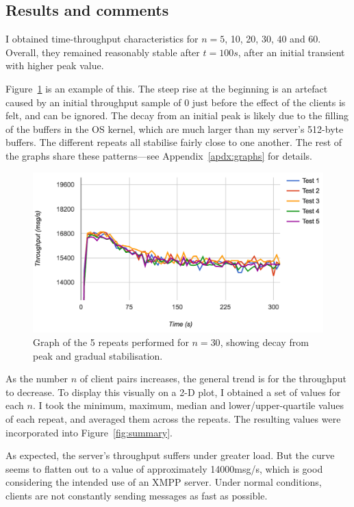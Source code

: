 \subsection{Results and comments}
I obtained time-throughput characteristics for $n=5$, 10, 20, 30, 40 and 60. Overall, they remained reasonably stable after $t=100s$, after an initial transient with higher peak value.

Figure~\ref{fig:example-chstic} is an example of this. The steep rise at the beginning is an artefact caused by an initial throughput sample of $0$ just before the effect of the clients is felt, and can be ignored. The decay from an initial peak is likely due to the filling of the buffers in the OS kernel, which are much larger than my server's 512-byte buffers. The different repeats all stabilise fairly close to one another. The rest of the graphs share these patterns---see Appendix~\ref{apdx:graphs} for details.

\begin{figure}
  \centering\includegraphics[width=\textwidth]{../transcripts/lipsum/30n30/cold/cold.png}
  \caption{Graph of the 5 repeats performed for $n=30$, showing decay from peak and gradual stabilisation.}
  \label{fig:example-chstic}
\end{figure}

As the number $n$ of client pairs increases, the general trend is for the throughput to decrease. To display this visually on a 2-D plot, I obtained a set of values for each $n$. I took the minimum, maximum, median and lower/upper-quartile values of each repeat, and averaged them across the repeats. The resulting values were incorporated into Figure~\ref{fig:summary}.

As expected, the server's throughput suffers under greater load. But the curve seems to flatten out to a value of approximately 14000msg/s, which is good considering the intended use of an XMPP server. Under normal conditions, clients are not constantly sending messages as fast as possible.

